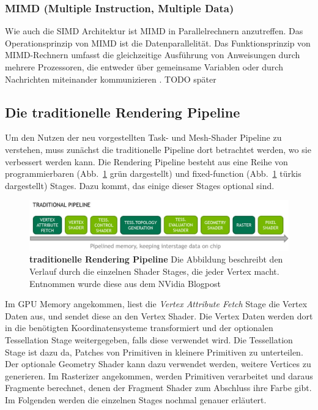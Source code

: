 \subsubsection*{MIMD (Multiple Instruction, Multiple Data)}
Wie auch die SIMD Architektur ist MIMD in Parallelrechnern anzutreffen.
Das Operationsprinzip von MIMD ist die Datenparallelität.
Das Funktionsprinzip von MIMD-Rechnern umfasst die gleichzeitige Ausführung von Anweisungen durch mehrere Prozessoren, die entweder über gemeinsame Variablen oder durch Nachrichten miteinander kommunizieren \cite{DalCin1996}.
TODO später \cite{Jakob2017} \newpage

\subsection{Die traditionelle Rendering Pipeline}
\label{subsec:traditionelle_renderingpipeline}
Um den Nutzen der neu vorgestellten Task- und Mesh-Shader Pipeline zu verstehen, muss zunächst die traditionelle Pipeline dort betrachtet werden, wo sie verbessert werden kann.
Die Rendering Pipeline besteht aus eine Reihe von programmierbaren (Abb.~\ref{fig:traditional_pipeline} grün dargestellt) und fixed-function (Abb.~\ref{fig:traditional_pipeline} türkis dargestellt) Stages.
Dazu kommt, das einige dieser Stages optional sind.
\begin{figure}[htb]
  \centering  
  \includegraphics[scale=0.43]{Bilder/traditionelle_pipeline.jpg}
  \caption[traditionelle Rendering Pipeline]{\textbf{traditionelle Rendering Pipeline} \newline Die Abbildung beschreibt den Verlauf durch die einzelnen Shader Stages, die jeder Vertex macht. Entnommen wurde diese aus dem NVidia Blogpost \cite{Kubisch2018}}
  \label{fig:traditional_pipeline}
\end{figure}
\newline
Im GPU Memory angekommen, liest die \textit{Vertex Attribute Fetch} Stage die Vertex Daten aus, und sendet diese an den Vertex Shader.
Die Vertex Daten werden dort in die benötigten Koordinatensysteme transformiert und der optionalen Tessellation Stage weitergegeben, falls diese verwendet wird.
Die Tessellation Stage ist dazu da, Patches von Primitiven in kleinere Primitiven zu unterteilen.
Der optionale Geometry Shader kann dazu verwendet werden, weitere Vertices zu generieren.
Im Rasterizer angekommen, werden Primitiven verarbeitet und daraus Fragmente berechnet, denen der Fragment Shader zum Abschluss ihre Farbe gibt. \newline
Im Folgenden werden die einzelnen Stages nochmal genauer erläutert.

